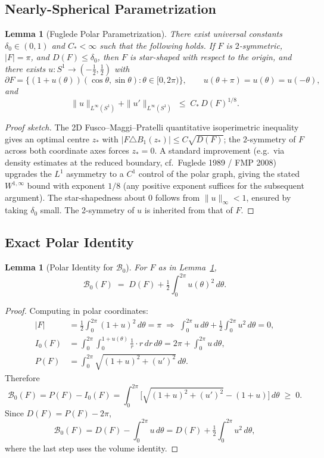 \documentclass[11pt]{article}
\newtheorem{lemma}[theorem]{Lemma}
\newcommand{\B}{\mathcal{B}}
\begin{document}
\subsection{Nearly-Spherical Parametrization}
\begin{lemma}[Fuglede Polar Parametrization] \label{lem:NS}
There exist universal constants $\delta_0 \in (0,1)$ and $C_*<\infty$ such that the following holds. If $F$ is $2$-symmetric, $|F|=\pi$, and $D(F)\le \delta_0$, then $F$ is star-shaped with respect to the origin, and there exists $u: S^1 \to (-\tfrac12,\tfrac12)$ with
\[ \partial F = \bigl\{ (1+u(\theta))(\cos\theta,\sin\theta) : \theta\in[0,2\pi) \bigr\}, \qquad u(\theta+\pi) = u(\theta) = u(-\theta), \]
and
\[ \|u\|_{L^\infty(S^1)} + \|u'\|_{L^\infty(S^1)} \;\le\; C_*\,D(F)^{1/8}. \]
\end{lemma}
\begin{proof}[Proof sketch]
The 2D Fusco--Maggi--Pratelli quantitative isoperimetric inequality gives an optimal centre $z_*$ with $|F\triangle B_1(z_*)|\le C\sqrt{D(F)}$; the $2$-symmetry of $F$ across both coordinate axes forces $z_*=0$. A standard improvement (e.g.\ via density estimates at the reduced boundary, cf.\ Fuglede 1989 / FMP 2008) upgrades the $L^1$ asymmetry to a $C^1$ control of the polar graph, giving the stated $W^{1,\infty}$ bound with exponent $1/8$ (any positive exponent suffices for the subsequent argument). The star-shapedness about $0$ follows from $\|u\|_\infty<1$, ensured by taking $\delta_0$ small. The 2-symmetry of $u$ is inherited from that of $F$.
\end{proof}

\subsection{Exact Polar Identity}
\begin{lemma}[Polar Identity for $\B_0$] \label{lem:PolarId}
For $F$ as in Lemma~\ref{lem:NS},
\[ \B_0(F) \;=\; D(F) + \tfrac{1}{2}\!\int_0^{2\pi}\! u(\theta)^2\,d\theta. \]
\end{lemma}
\begin{proof}
Computing in polar coordinates:
\begin{align*}
|F| &= \tfrac{1}{2}\int_0^{2\pi}(1+u)^2\,d\theta = \pi \;\Longrightarrow\; \int_0^{2\pi}\! u\,d\theta + \tfrac{1}{2}\int_0^{2\pi}\! u^2\,d\theta = 0, \\
I_0(F) &= \int_0^{2\pi}\!\!\!\int_0^{1+u(\theta)}\!\!\!\tfrac{1}{r}\cdot r\,dr\,d\theta = 2\pi + \int_0^{2\pi}\! u\,d\theta, \\
P(F) &= \int_0^{2\pi}\!\!\sqrt{(1+u)^2 + (u')^2}\,d\theta.
\end{align*}
Therefore
\[
  \B_0(F) = P(F) - I_0(F) = \int_0^{2\pi}\!\bigl[\sqrt{(1+u)^2+(u')^2} - (1+u)\bigr]\,d\theta \;\ge\; 0.
\]
Since $D(F) = P(F) - 2\pi$,
\[
  \B_0(F) = D(F) - \int_0^{2\pi}\! u\,d\theta = D(F) + \tfrac{1}{2}\!\int_0^{2\pi}\! u^2\,d\theta,
\]
where the last step uses the volume identity. \qedhere
\end{proof}
\end{document}
